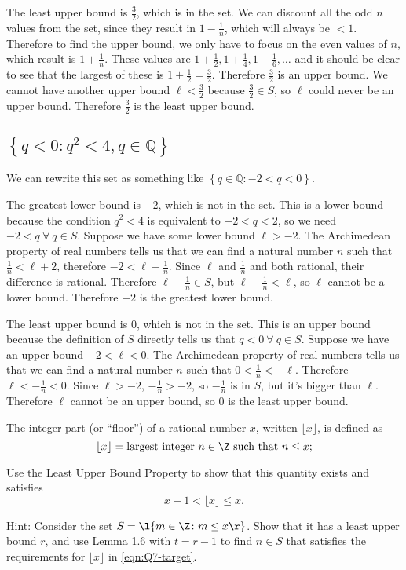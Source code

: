 \documentclass[a4paper]{article}
\begin{document}
The least upper bound is $\frac32$, which is in the set. We can discount all the odd $n$ values from the set, since they result in $1 - \frac1n$, which will always be $< 1$. Therefore to find the upper bound, we only have to focus on the even values of $n$, which result is $1 + \frac1n$. These values are $1 + \frac12, 1 + \frac14, 1 + \frac16, \ldots$ and it should be clear to see that the largest of these is $1 + \frac12 = \frac32$. Therefore $\frac32$ is an upper bound. We cannot have another upper bound $\ell < \frac32$ because $\frac32 \in S$, so $\ell$ could never be an upper bound. Therefore $\frac32$ is the least upper bound.

\subsection{$\left\{ q < 0 : q^2 < 4, q \in \mathbb{Q} \right\}$}

We can rewrite this set as something like $\left\{ q \in \mathbb Q : -2 < q < 0 \right\}$.

The greatest lower bound is $-2$, which is not in the set. This is a lower bound because the condition $q^2 < 4$ is equivalent to $-2 < q < 2$, so we need $-2 < q\ \forall\ q \in S$. Suppose we have some lower bound $\ell > -2$. The Archimedean property of real numbers tells us that we can find a natural number $n$ such that $\frac1n < \ell + 2$, therefore $-2 < \ell - \frac1n$. Since $\ell$ and $\frac1n$ and both rational, their difference is rational. Therefore $\ell - \frac1n \in S$, but $\ell - \frac1n < \ell$, so $\ell$ cannot be a lower bound. Therefore $-2$ is the greatest lower bound.

The least upper bound is $0$, which is not in the set. This is an upper bound because the definition of $S$ directly tells us that $q < 0\ \forall\ q \in S$. Suppose we have an upper bound $-2 < \ell < 0$. The Archimedean property of real numbers tells us that we can find a natural number $n$ such that $0 < \frac1n < -\ell$. Therefore $\ell < -\frac1n < 0$. Since $\ell > -2$, $-\frac1n > -2$, so $-\frac1n$ is in $S$, but it's bigger than $\ell$. Therefore $\ell$ cannot be an upper bound, so $0$ is the least upper bound.


\begin{questionbody}
The integer part (or \enquote{floor}) of a rational number $x$, written $\lfloor x \rfloor$, is defined as \[
\lfloor x \rfloor = \text{largest integer } n \in \Z \text{ such that } n \le x;
\]

Use the Least Upper Bound Property to show that this quantity exists and satisfies \begin{equation}
x - 1 < \lfloor x \rfloor \le x.
\label{eqn:Q7-target}
\end{equation}

Hint: Consider the set $S = \l\{ m \in \Z \colon m \le x \r\}$. Show that it has a least upper bound $r$,
and use Lemma 1.6 with $t = r − 1$ to find $n \in S$ that satisfies the requirements for $\lfloor x \rfloor$ in \eqref{eqn:Q7-target}.
\end{questionbody}
\end{document}
